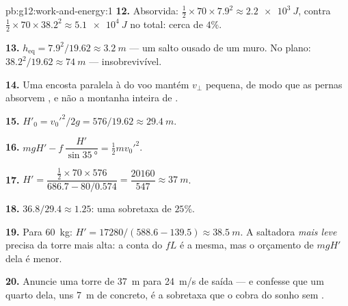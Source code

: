 \begin{solution}{pb:g12:work-and-energy:1}
\textbf{12.} Absorvida: $\tfrac12 \times 70 \times 7.9^2 \approx
\qty{2.2e3}{J}$, contra $\tfrac12 \times 70 \times 38.2^2 \approx
\qty{5.1e4}{J}$ no total: cerca de $4\%$.

\textbf{13.} $h_{\text{eq}} = 7.9^2/19.62 \approx \qty{3.2}{m}$ --- um
salto ousado de um muro. No plano: $38.2^2/19.62 \approx \qty{74}{m}$ ---
insobrevivível.

\textbf{14.} Uma encosta paralela à  do voo mantém $v_\perp$
pequena, de modo que as pernas absorvem , e não a montanha inteira
de .

\textbf{15.} $H'_0 = v_0'^2/2g = 576/19.62 \approx \qty{29.4}{m}$.

\textbf{16.} $mgH' - f\,\dfrac{H'}{\sin\qty{35}{\degree}} =
\tfrac12 m v_0'^2$.

\textbf{17.} $H' = \dfrac{\tfrac12 \times 70 \times 576}
{686.7 - 80/0.574} = \dfrac{\num{20160}}{547} \approx \qty{37}{m}$.

\textbf{18.} $36.8/29.4 \approx 1.25$: uma sobretaxa de $25\%$.

\textbf{19.} Para \qty{60}{kg}: $H' = \num{17280}/(588.6 - 139.5)
\approx \qty{38.5}{m}$. A saltadora \emph{mais leve} precisa da torre
mais alta: a conta do  $fL$ é a mesma, mas o orçamento de 
$mgH'$ dela é menor.

\textbf{20.} Anuncie uma torre de \qty{37}{m} para \qty{24}{m/s} de
saída --- e confesse que um quarto dela, uns \qty{7}{m} de concreto, é a
sobretaxa que o  cobra do sonho sem .
\end{solution}
